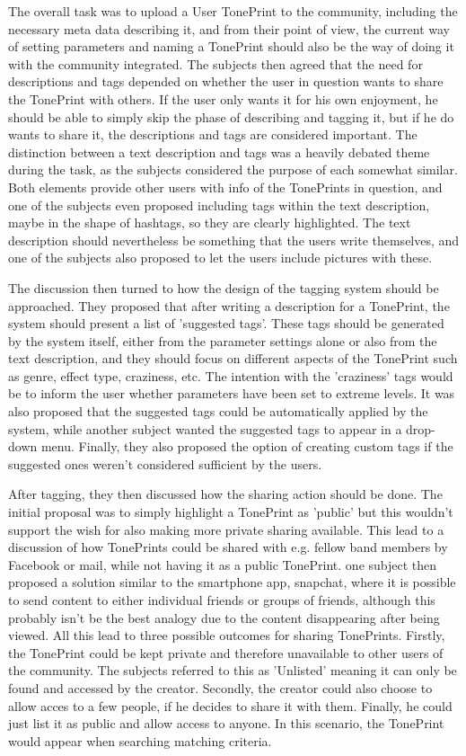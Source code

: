\noindent
The overall task was to upload a User TonePrint to the community, including the necessary meta data describing it, and from their point of view, the current way of setting parameters and naming a TonePrint should also be the way of doing it with the community integrated. The subjects then agreed that the need for descriptions and tags depended on whether the user in question wants to share the TonePrint with others. If the user only wants it for his own enjoyment, he should be able to simply skip the phase of describing and tagging it, but if he do wants to share it, the descriptions and tags are considered important. The distinction between a text description and tags was a heavily debated theme during the task, as the subjects considered the purpose of each somewhat similar. Both elements provide other users with info of the TonePrints in question, and one of the subjects even proposed including tags within the text description, maybe in the shape of hashtags, so they are clearly highlighted. The text description should nevertheless be something that the users write themselves, and one of the subjects also proposed to let the users include pictures with these.

The discussion then turned to how the design of the tagging system should be approached. They proposed that after writing a description for a TonePrint, the system should present a list of 'suggested tags'. These tags should be generated by the system itself, either from the parameter settings alone or also from the text description, and they should focus on different aspects of the TonePrint such as genre, effect type, craziness, etc. The intention with the 'craziness' tags would be to inform the user whether parameters have been set to extreme levels. It was also proposed that the suggested tags could be automatically applied by the system, while another subject wanted the suggested tags to appear in a drop-down menu. Finally, they also proposed the option of creating custom tags if the suggested ones weren't considered sufficient by the users.

After tagging, they then discussed how the sharing action should be done. The initial proposal was to simply highlight a TonePrint as 'public' but this wouldn't support the wish for also making more private sharing available. This lead to a discussion of how TonePrints could be shared with e.g. fellow band members by Facebook or mail, while not having it as a public TonePrint. one subject then proposed a solution similar to the smartphone app, snapchat, where it is possible to send content to either individual friends or groups of friends, although this probably isn't be the best analogy due to the content disappearing after being viewed. All this lead to three possible outcomes for sharing TonePrints. Firstly, the TonePrint could be kept private and therefore unavailable to other users of the community. The subjects referred to this as 'Unlisted' meaning it can only be found and accessed by the creator. Secondly, the creator could also choose to allow acces to a few people, if he decides to share it with them. Finally, he could just list it as public and allow access to anyone. In this scenario, the TonePrint would appear when searching matching criteria.

